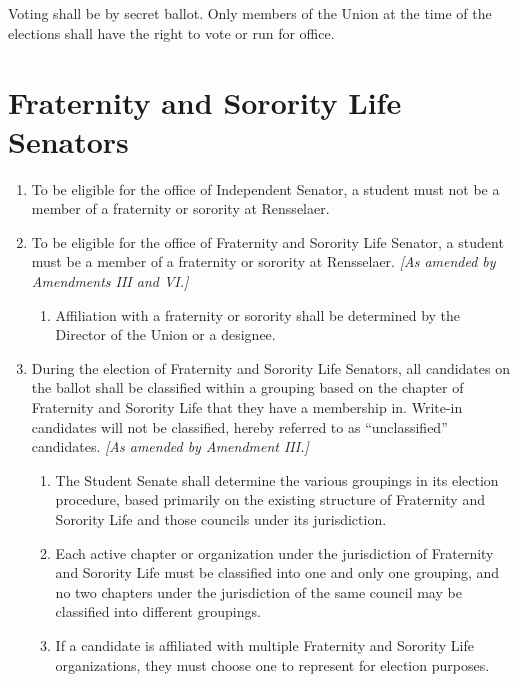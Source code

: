 \documentclass{uniondoc}
\begin{document}
\section{}

Voting shall be by secret ballot. Only members of the Union at the time of the elections shall have the right to vote or run for office.

\section{Fraternity and Sorority Life Senators}

\begin{enumerate}
	\item To be eligible for the office of Independent Senator, a student must not be a member of a fraternity or sorority at Rensselaer.
	\item To be eligible for the office of Fraternity and Sorority Life Senator, a student must be a member of a fraternity or sorority at Rensselaer. \textit{[As amended by Amendments III and VI.]}
	      \begin{enumerate}
		      \item Affiliation with a fraternity or sorority shall be determined by the Director of the Union or a designee.
	      \end{enumerate}
	\item During the election of Fraternity and Sorority Life Senators, all candidates on the ballot shall be classified within a grouping based on the chapter of Fraternity and Sorority Life that they have a membership in. Write-in candidates will not be classified, hereby referred to as ``unclassified'' candidates. \textit{[As amended by Amendment III.]}
	      \begin{enumerate}
		      \item The Student Senate shall determine the various groupings in its election procedure, based primarily on the existing structure of Fraternity and Sorority Life and those councils under its jurisdiction.
		      \item Each active chapter or organization under the jurisdiction of Fraternity and Sorority Life must be classified into one and only one grouping, and no two chapters under the jurisdiction of the same council may be classified into different groupings.
		      \item If a candidate is affiliated with multiple Fraternity and Sorority Life organizations, they must choose one to represent for election purposes.

\end{enumerate}
\end{enumerate}
\end{document}
